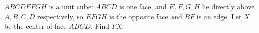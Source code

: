 $ABCDEFGH$ is a unit cube: $ABCD$ is one face, and $E,F,G,H$ lie directly above $A,B,C,D$ respectively, so $EFGH$ is the opposite face and $BF$ is an edge. Let $X$ be the center of face $ABCD$. Find $FX$.
